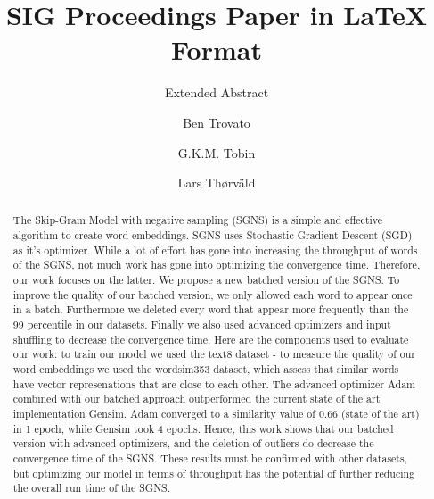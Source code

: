 \documentclass[sigconf]{acmart}
\begin{document}
\title{SIG Proceedings Paper in LaTeX Format}
\subtitle{Extended Abstract}


\author{Ben Trovato}

\author{G.K.M. Tobin}


\author{Lars Th{\o}rv{\"a}ld}


\renewcommand{\shortauthors}{B. Trovato et al.}


\begin{abstract}
The Skip-Gram Model with negative sampling (SGNS) is a simple and effective algorithm to create word embeddings. SGNS uses Stochastic Gradient Descent (SGD) as it's optimizer. While a lot of effort has gone into increasing the throughput of words of the SGNS, not much work has gone into optimizing the convergence time. Therefore, our work focuses on the latter. We propose a new batched version of the SGNS. To improve the quality of our batched version, we only allowed each word to appear once in a batch. Furthermore we deleted every word that appear more frequently than the 99 percentile in our datasets.  Finally we also used advanced optimizers and input shuffling to decrease the convergence time. Here are the components used to evaluate our work: to train our model we used the text8 dataset - to measure the quality of our word embeddings we used the wordsim353 dataset, which assess that similar words have vector represenations that are close to each other. The advanced optimizer Adam combined with our batched approach outperformed the current state of the art implementation Gensim. Adam converged to a similarity value of 0.66 (state of the art) in 1 epoch, while Gensim took 4 epochs. Hence, this work shows that our batched version with advanced optimizers, and the deletion of outliers do decrease the convergence time of the SGNS. These results must be confirmed with other datasets, but optimizing our model in terms of throughput has the potential of further reducing the overall run time of the SGNS.


\end{abstract}
\end{document}
